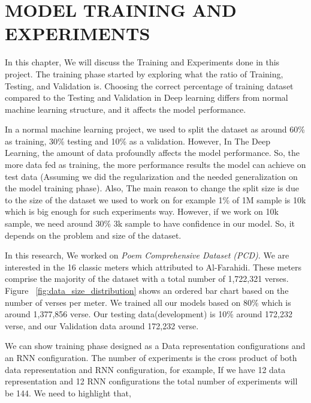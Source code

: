 \chapter{\uppercase{Model Training and Experiments}}\label{ch_model_training}

In this chapter, We will discuss the Training and Experiments done in this project. The training phase started by exploring what the ratio of Training, Testing, and Validation is. Choosing the correct percentage of training dataset compared to the Testing and Validation in Deep learning differs from normal machine learning structure, and it affects the model performance.

In a normal machine learning project, we used to split the dataset as around 60\% as training, 30\% testing and 10\% as a validation. However, In The Deep Learning, the amount of data profoundly affects the model performance. So, the more data fed as training, the more performance results the model can achieve on test data (Assuming we did the regularization and the needed generalization on the model training phase). Also, The main reason to change the split size is due to the size of the dataset we used to work on for example 1\% of 1M sample is 10k which is big enough for such experiments way. However, if we work on 10k sample, we need around 30\% 3k sample to have confidence in our model. So, it depends on the problem and size of the dataset.

In this research, We worked on \textit{Poem Comprehensive Dataset (PCD)}\cite{ArabicpoetryDS}. We are interested in the 16 classic meters which attributed to Al-Farahidi. These meters comprise the majority of the dataset with a total number of 1,722,321 verses. Figure ~\ref{fig:data_size_distribution} shows an ordered bar chart based on the number of verses per meter. We trained all our models based on 80\% which is around 1,377,856 verse. Our testing data(development) is 10\% around 172,232 verse, and our Validation data around 172,232 verse.

We can show training phase designed as a Data representation configurations and an RNN configuration. The number of experiments is the cross product of both data representation and RNN configuration, for example, If we have 12 data representation and 12 RNN configurations the total number of experiments will be 144. We need to highlight that,

